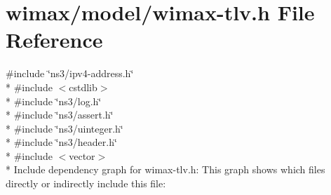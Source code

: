 \hypertarget{wimax-tlv_8h}{}\section{wimax/model/wimax-\/tlv.h File Reference}
\label{wimax-tlv_8h}
{\ttfamily \#include \char`\"{}ns3/ipv4-\/address.\+h\char`\"{}}\\*
{\ttfamily \#include $<$cstdlib$>$}\\*
{\ttfamily \#include \char`\"{}ns3/log.\+h\char`\"{}}\\*
{\ttfamily \#include \char`\"{}ns3/assert.\+h\char`\"{}}\\*
{\ttfamily \#include \char`\"{}ns3/uinteger.\+h\char`\"{}}\\*
{\ttfamily \#include \char`\"{}ns3/header.\+h\char`\"{}}\\*
{\ttfamily \#include $<$vector$>$}\\*
Include dependency graph for wimax-\/tlv.h\+:
This graph shows which files directly or indirectly include this file\+:
